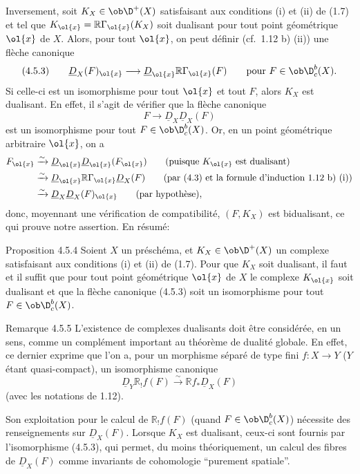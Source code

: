 Inversement, soit $K_X\in\ob\D^+(X)$ satisfaisant aux conditions (i) et (ii) de (1.7) et tel que $K_{\ol{x}}=\mathbb{R}\Gamma_{\ol{x}}(K_X)$ soit dualisant pour tout point géométrique $\ol{x}$ de $X$. Alors, pour tout $\ol{x}$, on peut définir (cf.~1.12 b) (ii)) une flèche canonique
\[
(4.5.3)\qquad \underline{D}_X(F)_{\ol{x}}\longrightarrow \underline{D}_{\ol{x}}\mathbb{R}\Gamma_{\ol{x}}(F)\qquad \text{pour } F\in\ob\D_c^b(X).
\]
Si celle-ci est un isomorphisme pour tout $\ol{x}$ et tout $F$, alors $K_X$ est dualisant. En effet, il s'agit de vérifier que la flèche canonique
\[
F\longrightarrow \underline{D}_X\underline{D}_X(F)
\]
est un isomorphisme pour tout $F\in\ob\D_c^b(X)$. Or, en un point géométrique arbitraire $\ol{x}$, on a
\[
\begin{aligned}
F_{\ol{x}}&\xrightarrow{\sim}\underline{D}_{\ol{x}}\underline{D}_{\ol{x}}(F_{\ol{x}})\qquad\text{(puisque $K_{\ol{x}}$ est dualisant)}\\
&\xrightarrow{\sim}\underline{D}_{\ol{x}}\mathbb{R}\Gamma_{\ol{x}}\underline{D}_X(F)\qquad\text{(par (4.3) et la formule d'induction 1.12 b) (i))}\\
&\xrightarrow{\sim}\underline{D}_X\underline{D}_X(F)_{\ol{x}}\qquad\text{(par hypothèse)},
\end{aligned}
\]
donc, moyennant une vérification de compatibilité, $(F,K_X)$ est bidualisant, ce qui prouve notre assertion. En résumé:

\begin{statement}{Proposition 4.5.4}
Soient $X$ un préschéma, et $K_X\in\ob\D^+(X)$ un complexe satisfaisant aux conditions (i) et (ii) de (1.7). Pour que $K_X$ soit dualisant, il faut et il suffit que pour tout point géométrique $\ol{x}$ de $X$ le complexe $K_{\ol{x}}$ soit dualisant et que la flèche canonique (4.5.3) soit un isomorphisme pour tout $F\in\ob\D_c^b(X)$.
\end{statement}

\begin{statement}{Remarque 4.5.5}
L'existence de complexes dualisants doit être considérée, en un sens, comme un complément important au théorème de dualité globale. En effet, ce dernier exprime que l'on a, pour un morphisme séparé de type fini $f:X\to Y$ ($Y$ étant quasi-compact), un isomorphisme canonique
\[
\underline{D}_Y\mathbb{R}_!f(F)\xrightarrow{\sim}\mathbb{R} f_*\underline{D}_X(F)
\]
(avec les notations de 1.12).

Son exploitation pour le calcul de $\mathbb{R}_!f(F)$ (quand $F\in\ob\D_c^b(X)$) nécessite des renseignements sur $\underline{D}_X(F)$. Lorsque $K_X$ est dualisant, ceux-ci sont fournis par l'isomorphisme (4.5.3), qui permet, du moins théoriquement, un calcul des fibres de $\underline{D}_X(F)$ comme invariants de cohomologie ``purement spatiale''.
\end{statement}

